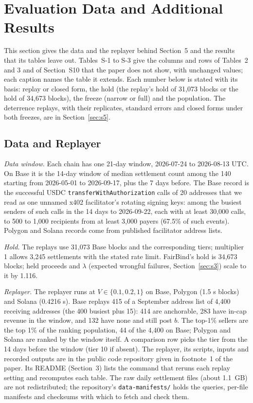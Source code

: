 \documentclass[10pt,a4paper]{article}
\newcommand{\vmax}{V}
\theoremstyle{plain}
\theoremstyle{remark}
\begin{document}
\section{Evaluation Data and Additional Results}
\label{sec:moved}

This section gives the data and the replayer behind Section~5 and the results that its tables leave out. Tables~S-1 to S-3 give the columns and rows of Tables~2 and 3 and of Section~S10 that the paper does not show, with unchanged values; each caption names the table it extends. Each number below is stated with its basis: replay or closed form, the hold (the replay's hold of 31,073 blocks or the hold of 34,673 blocks), the freeze (narrow or full) and the population. The deterrence replays, with their replicates, standard errors and closed forms under both freezes, are in Section~\ref{sec:s5}.

\subsection{Data and Replayer}
\label{sec:data}

\emph{Data window.} Each chain has one 21-day window, 2026-07-24 to 2026-08-13 UTC. On Base it is the 14-day window of median settlement count among the 140 starting from 2026-05-01 to 2026-09-17, plus the 7 days before. The Base record is the successful USDC \texttt{transferWithAuthorization} calls of 20 addresses that we read as one unnamed x402 facilitator's rotating signing keys: among the busiest senders of such calls in the 14 days to 2026-09-22, each with at least 30,000 calls, to 500 to 1,000 recipients from at least 3,000 payers (67.5\% of such events). Polygon and Solana records come from published facilitator address lists.

\emph{Hold.} The replays use 31,073 Base blocks and the corresponding tiers; multiplier 1 allows 3,245 settlements with the stated rate limit. FairBind's hold is 34,673 blocks; held proceeds and $\lambda$ (expected wrongful failures, Section~\ref{sec:s3}) scale to it by 1.116.

\emph{Replayer.} The replayer runs at $\vmax\in\{0.1,0.2,1\}$ on Base, Polygon (1.5 s blocks) and Solana (0.4216 s). Base replays 415 of a September address list of 4,400 receiving addresses (the 400 busiest plus 15): 414 are anchorable, 283 have in-cap revenue in the window, and 132 have none and still post $b$. The top-1\% sellers are the top 1\% of the ranking population, 44 of the 4,400 on Base; Polygon and Solana are ranked by the window itself. A comparison row picks the tier from the 14 days before the window (tier 10 if absent). The replayer, its scripts, inputs and recorded outputs are in the public code repository given in footnote~1 of the paper. Its README (Section~3) lists the command that reruns each replay setting and recomputes each table. The raw daily settlement files (about 1.1~GB) are not redistributed; the repository's \texttt{data-manifests/} holds the queries, per-file manifests and checksums with which to fetch and check them.
\end{document}
